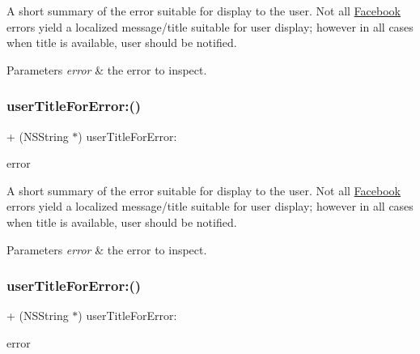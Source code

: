 A short summary of the error suitable for display to the user. Not all \hyperlink{interfaceFacebook}{Facebook} errors yield a localized message/title suitable for user display; however in all cases when title is available, user should be notified.


\begin{DoxyParams}{Parameters}
{\em error} & the error to inspect. \\
\hline
\end{DoxyParams}
\mbox{\label{interfaceFBErrorUtility_a6b294817d5d939cfa12975d994d1dd8b}} 
\subsubsection{\texorpdfstring{user\+Title\+For\+Error\+:()}{userTitleForError:()}\hspace{0.1cm}{\footnotesize\ttfamily [2/5]}}
{\footnotesize\ttfamily + (N\+S\+String $\ast$) user\+Title\+For\+Error\+: \begin{DoxyParamCaption}\item[{(N\+S\+Error $\ast$)}]{error }\end{DoxyParamCaption}}

A short summary of the error suitable for display to the user. Not all \hyperlink{interfaceFacebook}{Facebook} errors yield a localized message/title suitable for user display; however in all cases when title is available, user should be notified.


\begin{DoxyParams}{Parameters}
{\em error} & the error to inspect. \\
\hline
\end{DoxyParams}
\mbox{\label{interfaceFBErrorUtility_a6b294817d5d939cfa12975d994d1dd8b}} 
\subsubsection{\texorpdfstring{user\+Title\+For\+Error\+:()}{userTitleForError:()}\hspace{0.1cm}{\footnotesize\ttfamily [3/5]}}
{\footnotesize\ttfamily + (N\+S\+String $\ast$) user\+Title\+For\+Error\+: \begin{DoxyParamCaption}\item[{(N\+S\+Error $\ast$)}]{error }\end{DoxyParamCaption}}

